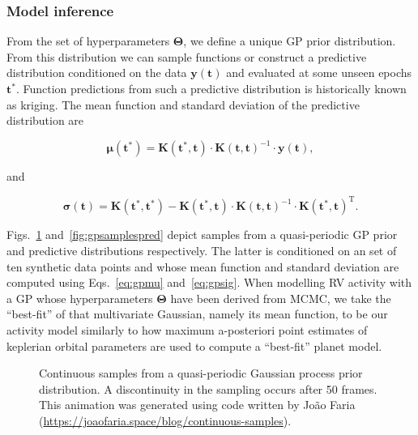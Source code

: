 \subsubsection{Model inference}
From the set of hyperparameters $\boldsymbol{\Theta}$,
we define a unique GP prior distribution. From this distribution we can sample
functions or construct a predictive distribution
conditioned on the data $\mathbf{y}(\mathbf{t})$ and evaluated at some unseen
epochs $\mathbf{t}^*$. Function predictions from such a predictive distribution is
historically known as kriging. The mean function and standard deviation of the
predictive distribution are

\begin{equation}
  \boldsymbol{\mu}(\mathbf{t}^*) = \mathbf{K}(\mathbf{t}^*,\mathbf{t}) \cdot
  \mathbf{K}(\mathbf{t},\mathbf{t})^{-1} \cdot \mathbf{y}(\mathbf{t}),
  \label{eq:gpmu}
\end{equation}

\noindent and

\begin{equation}
  \boldsymbol{\sigma}(\mathbf{t}) = \mathbf{K}(\mathbf{t}^*,\mathbf{t}^*) -
  \mathbf{K}(\mathbf{t}^*,\mathbf{t}) \cdot \mathbf{K}(\mathbf{t},\mathbf{t})^{-1}
  \cdot \mathbf{K}(\mathbf{t}^*,\mathbf{t})^{\text{T}}.
  \label{eq:gpsig}
\end{equation}

Figs.~\ref{fig:gpsamples} and~\ref{fig:gpsamplespred} depict samples from a
quasi-periodic GP prior and predictive distributions respectively. The latter is
conditioned on an set of ten synthetic data points and whose mean function and
standard deviation are computed using Eqs.~\ref{eq:gpmu} and~\ref{eq:gpsig}. When
modelling RV activity with a GP whose hyperparameters $\boldsymbol{\Theta}$ have
been derived from MCMC, we take the ``best-fit'' of that multivariate Gaussian, namely
its mean function, to be our activity model similarly to how maximum a-posteriori
point estimates of keplerian orbital parameters are used to compute a ``best-fit''
planet model. \\

\begin{figure}
  \centering
  \caption[Samples from a quasi-periodic Gaussian process prior distribution.]
          {Continuous samples from a quasi-periodic Gaussian process prior distribution.
            A discontinuity in the sampling occurs after 50 frames. This animation was
            generated using code written by Jo\~ao
            Faria (\url{https://joaofaria.space/blog/continuous-samples}).}
  \label{fig:gpsamples}
\end{figure}

